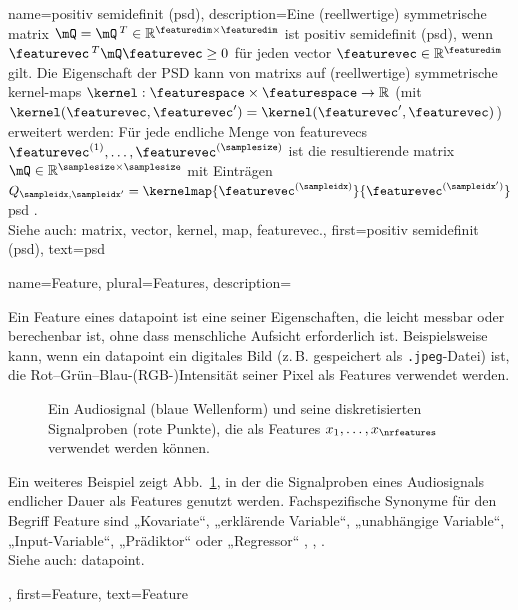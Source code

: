 {{{{
{name={positiv semidefinit (psd)},
	description={Eine (reellwertige) symmetrische \gls{matrix} 
	 	$\mQ = \mQ\,^{T} \in \mathbb{R}^{\featuredim \times \featuredim}$ 
	 	ist positiv semidefinit (psd), wenn $\featurevec\,^{T} \mQ \featurevec \geq 0$ 
	 	für jeden \gls{vector} $\featurevec \in \mathbb{R}^{\featuredim}$ gilt. 
	 	Die Eigenschaft der PSD kann von \glspl{matrix} auf (reellwertige) symmetrische 
	 	\gls{kernel}-\glspl{map} $\kernel: \featurespace \times \featurespace \rightarrow \mathbb{R}$ 
	 	(mit $\kernel(\featurevec,\featurevec') = \kernel(\featurevec',\featurevec)$) erweitert werden: 
	 	Für jede endliche Menge von \glspl{featurevec} $\featurevec^{(1)}, \ldots, \featurevec^{(\samplesize)}$ 
	 	ist die resultierende \gls{matrix} $\mQ \in \mathbb{R}^{\samplesize \times \samplesize}$ mit 
		Einträgen $Q_{\sampleidx,\sampleidx'} = \kernelmap{\featurevec^{(\sampleidx)}}{\featurevec^{(\sampleidx')}}$ 
		psd \cite{LearningKernelsBook}.
		\\
		Siehe auch: \gls{matrix}, \gls{vector}, \gls{kernel}, \gls{map}, \gls{featurevec}.},
	first={positiv semidefinit (psd)},
	text={psd}  
}


{name={Feature}, plural={Features},
description={Ein Feature eines \gls{datapoint} ist eine seiner Eigenschaften, 
    die leicht messbar oder berechenbar ist, ohne dass menschliche Aufsicht erforderlich ist. 
    Beispielsweise kann, wenn ein \gls{datapoint} ein digitales Bild (z.\,B. gespeichert als \texttt{.jpeg}-Datei) ist, 
    die Rot–Grün–Blau-(RGB-)Intensität seiner Pixel als Features verwendet werden. 
    \begin{figure}
    \centering
    \caption{Ein Audiosignal (blaue Wellenform) und seine diskretisierten Signalproben (rote Punkte), 
    die als Features $x_{1},\ldots,x_{\nrfeatures}$ verwendet werden können. \label{fig:audio_features_dict}}
    \end{figure}
    Ein weiteres Beispiel zeigt Abb.\ \ref{fig:audio_features_dict}, in der die Signalproben eines Audiosignals endlicher Dauer als Features genutzt werden.
    Fachspezifische Synonyme für den Begriff Feature sind „Kovariate“, „erklärende Variable“, 
    „unabhängige Variable“, „Input-Variable“, „Prädiktor“ oder „Regressor“ \cite{Gujarati2021}, \cite{Dodge2003}, \cite{Everitt2010}. 
        \\
    Siehe auch: \gls{datapoint}.},
first={Feature},
text={Feature}  
}

}}}}
